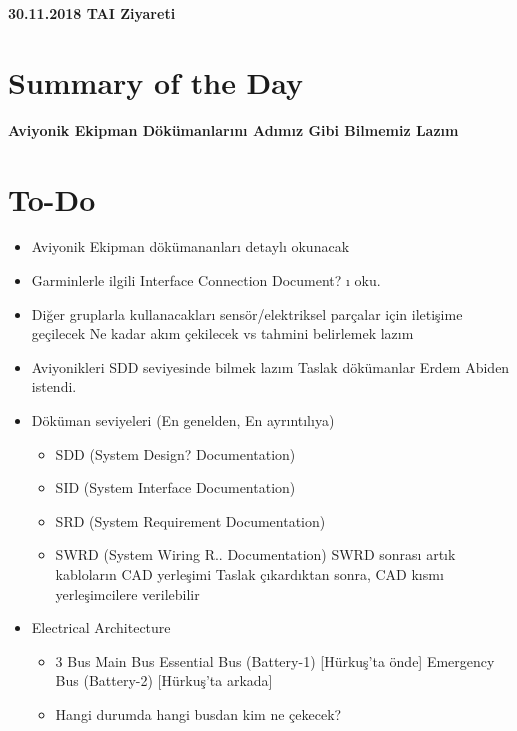 \documentclass[a4paper,12pt]{article}
\begin{document}
	
\begin{center}
	\Large\textbf{30.11.2018 TAI Ziyareti}
	\end{center}

\section{Summary of the Day}

	\large\textbf{Aviyonik Ekipman Dökümanlarını Adımız Gibi Bilmemiz Lazım}

\section{To-Do}

\begin{itemize}
	
	\item Aviyonik Ekipman dökümananları detaylı okunacak
	
	\item Garminlerle ilgili Interface Connection Document? ı oku. 
	
	\item Diğer gruplarla kullanacakları sensör/elektriksel parçalar için iletişime geçilecek
		\subitem *Ne kadar akım çekilecek vs tahmini belirlemek lazım
	\item Aviyonikleri SDD seviyesinde bilmek lazım
		\subitem *Taslak dökümanlar Erdem Abiden istendi.
	\item Döküman seviyeleri (En genelden, En ayrıntılıya)
		\begin{itemize}
			\item SDD (System Design? Documentation)
			\item SID (System Interface Documentation)
			\item SRD (System Requirement Documentation)
			\item SWRD (System Wiring R.. Documentation)
				\subitem *SWRD sonrası artık kabloların CAD yerleşimi
				\subitem *Taslak çıkardıktan sonra, CAD kısmı yerleşimcilere verilebilir
		\end{itemize}			
	\item Electrical Architecture
		\begin{itemize}
			\item 3 Bus
				\subitem *Main Bus
				\subitem *Essential Bus (Battery-1) [Hürkuş'ta önde]
				\subitem *Emergency Bus (Battery-2) [Hürkuş'ta arkada]
			\item Hangi durumda hangi busdan kim ne çekecek?
		\end{itemize}		
		

\end{itemize}
\end{document}
